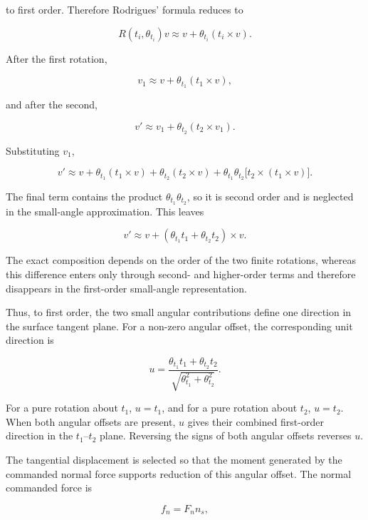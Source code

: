 to first order. Therefore Rodrigues' formula reduces to

\[
R(t_i,\theta_{t_i})v\approx v+\theta_{t_i}(t_i\times v).
\]

After the first rotation,

\[
v_1\approx v+\theta_{t_1}(t_1\times v),
\]

and after the second,

\[
v'\approx v_1+\theta_{t_2}(t_2\times v_1).
\]

Substituting \mbox{\(v_1\)},

\[
v'
\approx
v
+\theta_{t_1}(t_1\times v)
+\theta_{t_2}(t_2\times v)
+\theta_{t_1}\theta_{t_2}\bigl[t_2\times(t_1\times v)\bigr].
\]

The final term contains the product \mbox{\(\theta_{t_1}\theta_{t_2}\)}, so it
is second order and is neglected in the small-angle approximation. This leaves

\begin{equation}
v'
\approx
v+\left(\theta_{t_1}t_1+\theta_{t_2}t_2\right)\times v.
\label{eq:first_order_rotation_composition}
\end{equation}

The exact composition depends on the order of the two finite rotations, whereas
this difference enters only through second- and higher-order terms and
therefore disappears in the first-order small-angle representation.

Thus, to first order, the two small angular contributions define one direction
in the surface tangent plane. For a non-zero angular offset, the corresponding
unit direction is

\begin{equation}
u
=
\frac{\theta_{t_1}t_1+\theta_{t_2}t_2}
     {\sqrt{\theta_{t_1}^2+\theta_{t_2}^2}}.
\label{eq:angular_offset_unit_direction}
\end{equation}

For a pure rotation about \mbox{\(t_1\)}, \mbox{\(u=t_1\)}, and for a pure
rotation about \mbox{\(t_2\)}, \mbox{\(u=t_2\)}. When both angular offsets are
present, \mbox{\(u\)} gives their combined first-order direction in the
\mbox{\(t_1\)}--\mbox{\(t_2\)} plane. Reversing the signs of both angular
offsets reverses \mbox{\(u\)}.

The tangential  displacement is selected so that the moment generated
by the commanded normal force supports reduction of this angular offset. The
normal commanded force is

\[
f_n=F_nn_s,
\]

